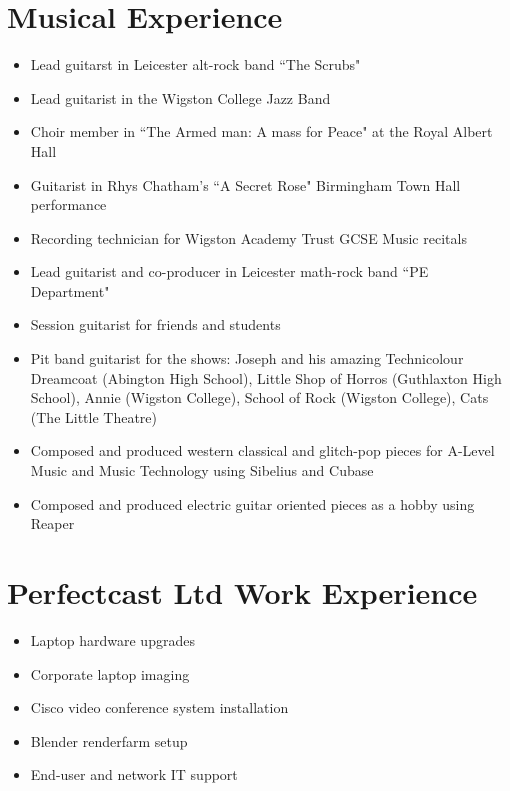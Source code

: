 \documentclass{article}
\begin{document}
\section{Musical Experience}
\begin{itemize}[noitemsep]

\renewcommand{\labelitemi}{$\square$}
\item Lead guitarst in Leicester alt-rock band ``The Scrubs"
\item Lead guitarist in the Wigston College Jazz Band
\item Choir member in ``The Armed man: A mass for Peace" at the Royal Albert Hall
\item Guitarist in Rhys Chatham's ``A Secret Rose" Birmingham Town Hall performance
\item Recording technician for Wigston Academy Trust GCSE Music recitals
\item Lead guitarist and co-producer in Leicester math-rock band ``PE Department"
\item Session guitarist for friends and students
\item Pit band guitarist for the shows: Joseph and his amazing Technicolour Dreamcoat (Abington High School),
Little Shop of Horros (Guthlaxton High School), Annie (Wigston College), School of Rock (Wigston College), Cats (The Little Theatre)
\item Composed and produced western classical and glitch-pop pieces for A-Level Music and Music Technology using Sibelius and Cubase
\item Composed and produced electric guitar oriented pieces as a hobby using Reaper

\end{itemize}


\section{Perfectcast Ltd Work Experience}


\begin{itemize}[noitemsep]

\renewcommand{\labelitemi}{$\square$}
\item Laptop hardware upgrades
\item Corporate laptop imaging
\item Cisco video conference system installation
\item Blender renderfarm setup
\item End-user and network IT support

\end{itemize}
\end{document}
